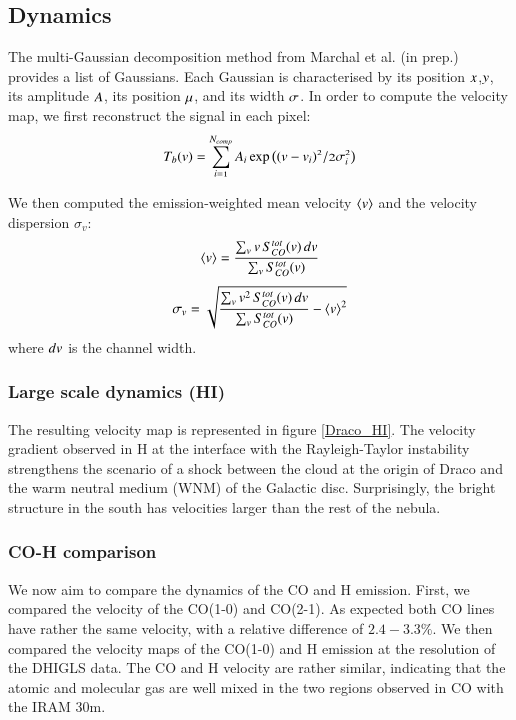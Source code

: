 \documentclass[traditabstract]{aa}
\begin{document}
   \subsection{Dynamics}

   The multi-Gaussian decomposition method from Marchal et al. (in prep.) provides a list of Gaussians. Each Gaussian is characterised by its position $\mathnormal{x}$,$\mathnormal{y}$, its amplitude $\mathnormal{A}$, its position $\mathnormal{\mu}$, and its width $\mathnormal{\sigma}$. In order to compute the velocity map, we first reconstruct the signal in each pixel:
\begin{equation}
  \mathnormal{T_b(v)=\sum_{i=1}^{N_{comp}} A_i \exp\left( (v-v_i)^2/2\sigma_i^2 \right)}
\end{equation}

   We then computed the emission-weighted mean velocity $\left< v \right>$ and the velocity dispersion $\sigma_v$:
\begin{equation}
  \mathnormal{\left< v \right>=\frac{\sum_v v\, S_{CO}^{tot}(v)\, dv}{\sum_v S_{CO}^{tot}(v)}}
\end{equation}
\begin{equation}
  \mathnormal{\sigma_v=\sqrt{\frac{\sum_v v^2\, S_{CO}^{tot}(v)\, dv}{\sum_v S_{CO}^{tot}(v)}-\left< v \right>^2}}
\end{equation} 
where $\mathnormal{dv}$ is the channel width.

      \subsubsection{Large scale dynamics (HI)}

   The resulting velocity map is represented in figure \ref{Draco_HI}. The velocity gradient observed in H at the interface with the Rayleigh-Taylor instability strengthens the scenario of a shock between the cloud at the origin of Draco and the warm neutral medium (WNM) of the Galactic disc.
Surprisingly, the bright structure in the south has velocities larger than the rest of the nebula.


      \subsubsection{CO-H comparison}

   We now aim to compare the dynamics of the CO and H emission. First, we compared the velocity of the CO(1-0) and CO(2-1). As expected both CO lines have rather the same velocity, with a relative difference of $2.4-3.3\%$. We then compared the velocity maps of the CO(1-0) and H emission at the resolution of the DHIGLS data. The CO and H velocity are rather similar, indicating that the atomic and molecular gas are well mixed in the two regions observed in CO with the IRAM 30m.
\end{document}
